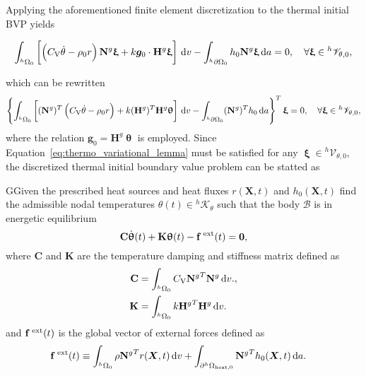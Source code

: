 Applying the aforementioned finite element discretization to the  thermal initial BVP yields
\begin{highlight}
\begin{equation}
  \int_{^h\Omega_0}   \left[\left(C_\mathrm{V} \dot \theta - \rho_0 r\right)  \mathbf N^g\bm \upxi +k\bm g_0\cdot \mathbf H^g \bm \upxi\right]\,\mathrm{d} v - \int_{^h\partial\Omega_0} h_0 \mathbf N^g\bm \upxi\,\mathrm{d} a = 0,\quad \forall \bm \upxi \in {}^h\mathscr{V}_{\theta,0},
\end{equation}
\end{highlight}
which can be rewritten
\begin{equation} \label{eq:thermo_variational_lemma}
  \left\{\int_{^h\Omega_0}   \left[(\mathbf N^g)^T\left(C_\mathrm{V} \dot \theta - \rho_0 r\right) +k(\mathbf H^g)^T\mathbf H^g \bm \uptheta \right]\,\mathrm{d} v - \int_{^h\partial\Omega_0} (\mathbf N^g)^T h_0 \,\mathrm{d} a \right\}^T\bm \upxi= 0,\quad \forall \bm \upxi \in {}^h\mathscr{V}_{\theta,0},
\end{equation}
where the relation \(\bm g_0 = \mathbf H^g \bm \uptheta\) is employed.
Since Equation~\eqref{eq:thermo_variational_lemma} must be satisfied for any \(\bm \upxi\in {}^h\mathscr V_{\theta,0}\), the discretized  thermal initial boundary value problem can be statted as
\begin{problem}
GGiven the prescribed heat sources and heat fluxes $r(\bm X, t)$ and $h_0(\bm X, t)$ find the admissible nodal temperatures $\theta(t)\in {^h\mathscr{K}_{\theta}}$ such that the body $\mathscr{B}$ is in energetic equilibrium
\begin{equation}
    \mathbf C \dot{ \bm\uptheta}(t) +\mathbf K\bm\uptheta(t)-\mathbf f^\text{\;ext}(t)=\mathbf 0, \label{eq:equilibrium_material}
\end{equation}
where $\mathbf C$ and \(\mathbf K\) are the temperature damping and stiffness matrix defined as
\begin{align}
  \mathbf C &= \int_{{}^h\Omega_0} C_\mathrm{V} {\mathbf{N}^g}^T \mathbf{N}^g \,\mathrm{d} v.,\\
  \mathbf K &= \int_{{}^h\Omega_0} k {\mathbf{H}^g}^T\mathbf{H}^g \,\mathrm{d} v.
\end{align}
and $\mathbf f^\text{\;ext}(t)$ is the global vector of external forces defined as
\begin{align}
    \mathbf f^\text{\;ext}(t) &\equiv \int_{^h\Omega_0} \rho{\mathbf N^g}^T r(\bm X, t)\,\mathrm{d} v + \int_{\partial^h\Omega_\text{heat,0}}{\mathbf N^g}^T h_0(\bm X, t)\,\mathrm{d} a.
\end{align}
\end{problem}

\newpage\null\thispagestyle{blank}\newpage
